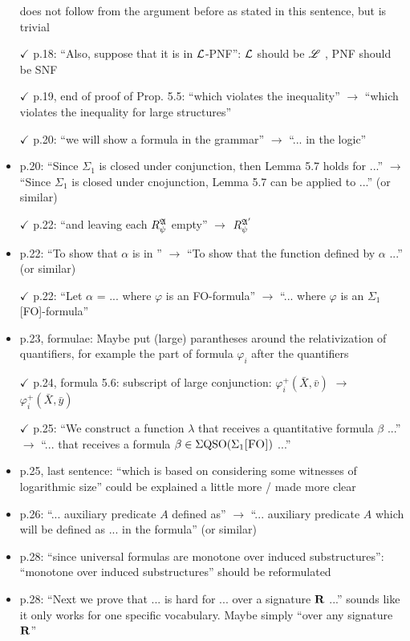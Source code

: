 \begin{itemize}
does not follow from the argument before as stated in this sentence, but is trivial
\item[$\checkmark$] p.18: ``Also, suppose that it is in $\mathcal{L}$-PNF'': $\mathcal{L}$ should be $\mathscr{L}$ , PNF should be SNF
\item[$\checkmark$] p.19, end of proof of Prop. 5.5: ``which violates the inequality'' $\to$ ``which violates the inequality
for large structures''
\item[$\checkmark$] p.20: ``we will show a formula in the grammar'' $\to$ ``... in the logic''
\item p.20: ``Since $\Sigma_1$ is closed under conjunction, then Lemma 5.7 holds for ...'' $\to$ ``Since $\Sigma_1$ is
closed under cnojunction, Lemma 5.7 can be applied to ...'' (or similar)
\item[$\checkmark$] p.22: ``and leaving each $R_{\psi}^{\mathfrak{A}}$ empty'' $\to$ $R_{\psi}^{\mathfrak{A}'}$
\item p.22: ``To show that $\alpha$ is in \totp'' $\to$ ``To show that the function defined by $\alpha$ ...'' (or similar)
\item[$\checkmark$] p.22: ``Let $\alpha$ = ... where $\varphi$ is an FO-formula'' $\to$ ``... where $\varphi$ is an $\Sigma_1$[FO]-formula''
\item p.23, formulae: Maybe put (large) parantheses around the relativization of quantifiers, for
example the part of formula $\varphi_i$ after the quantifiers
\item[$\checkmark$] p.24, formula 5.6: subscript of large conjunction: $\varphi_i^{+}(\bar{X},\bar{v})$ $\to$ $\varphi_i^{+}(\bar{X},\bar{y})$
\item[$\checkmark$] p.25: ``We construct a function $\lambda$ that receives a quantitative formula $\beta$ ...'' $\to$ ``... that receives
a formula $\beta \in \Sigma{\rm QSO}(\Sigma_{1}\textsc{[FO]})$ ...''
\item p.25, last sentence: ``which is based on considering some witnesses of logarithmic size'' could
be explained a little more / made more clear
\item p.26: ``... auxiliary predicate $A$ defined as'' $\to$ ``... auxiliary predicate $A$ which will be defined
as ... in the formula'' (or similar)
\item p.28: ``since universal formulas are monotone over induced substructures'': ``monotone over
induced substructures'' should be reformulated
\item p.28: ``Next we prove that ... is hard for ... over a signature $\mathbf{R}$ ...'' sounds like it only works
for one specific vocabulary. Maybe simply ``over any signature $\mathbf{R}$''

\end{itemize}
